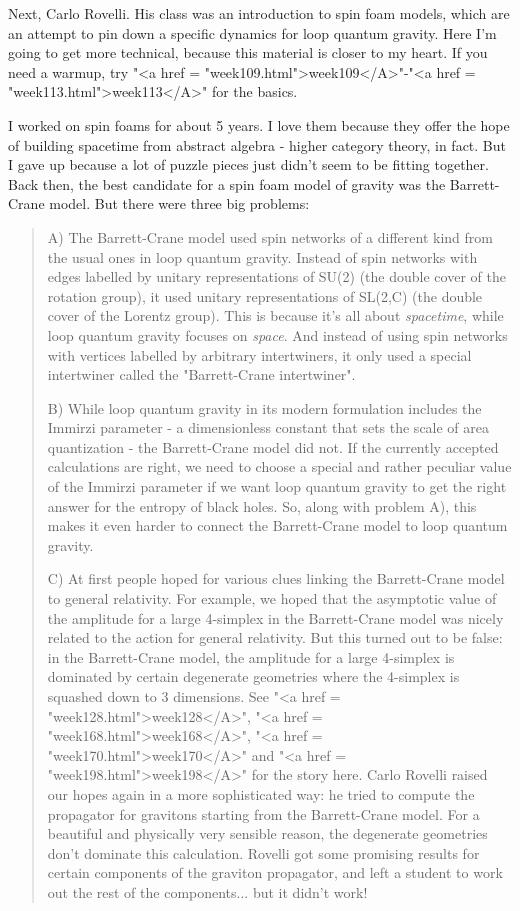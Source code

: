 Next, Carlo Rovelli.  His class was an introduction to spin foam
models, which are an attempt to pin down a specific dynamics for loop
quantum gravity.  Here I'm going to get more technical, because this
material is closer to my heart.  If you need a warmup, try
"<a href = "week109.html">week109</A>"-"<a href = "week113.html">week113</A>" for the basics.

I worked on spin foams for about 5 years.  I love them because they
offer the hope of building spacetime from abstract algebra - higher
category theory, in fact.  But I gave up because a lot of puzzle
pieces just didn't seem to be fitting together.  Back then, the best
candidate for a spin foam model of gravity was the Barrett-Crane
model.  But there were three big problems:

\begin{quote}
A) The Barrett-Crane model used spin networks of a different kind from
the usual ones in loop quantum gravity.  Instead of spin networks with
edges labelled by unitary representations of SU(2) (the double cover
of the rotation group), it used unitary representations of SL(2,C)
(the double cover of the Lorentz group).  This is because it's all
about \emph{spacetime}, while loop quantum gravity focuses on
\emph{space}.  And instead of using spin networks with vertices
labelled by arbitrary intertwiners, it only used a special intertwiner
called the "Barrett-Crane intertwiner".

B) While loop quantum gravity in its modern formulation includes the
Immirzi parameter - a dimensionless constant that sets the scale of
area quantization - the Barrett-Crane model did not.  If the currently
accepted calculations are right, we need to choose a special and
rather peculiar value of the Immirzi parameter if we want loop quantum
gravity to get the right answer for the entropy of black holes.  So,
along with problem A), this makes it even harder to connect the
Barrett-Crane model to loop quantum gravity.

C) At first people hoped for various clues linking the Barrett-Crane
model to general relativity.  For example, we hoped that the
asymptotic value of the amplitude for a large 4-simplex in the
Barrett-Crane model was nicely related to the action for general
relativity.  But this turned out to be false: in the Barrett-Crane
model, the amplitude for a large 4-simplex is dominated by certain
degenerate geometries where the 4-simplex is squashed down to 3
dimensions.  See "<a href = "week128.html">week128</A>",
"<a href = "week168.html">week168</A>", "<a href =
"week170.html">week170</A>" and "<a href =
"week198.html">week198</A>" for the story here.  Carlo Rovelli
raised our hopes again in a more sophisticated way: he tried to
compute the propagator for gravitons starting from the Barrett-Crane
model.  For a beautiful and physically very sensible reason, the
degenerate geometries don't dominate this calculation.  Rovelli got
some promising results for certain components of the graviton
propagator, and left a student to work out the rest of the
components... but it didn't work!
\end{quote}


